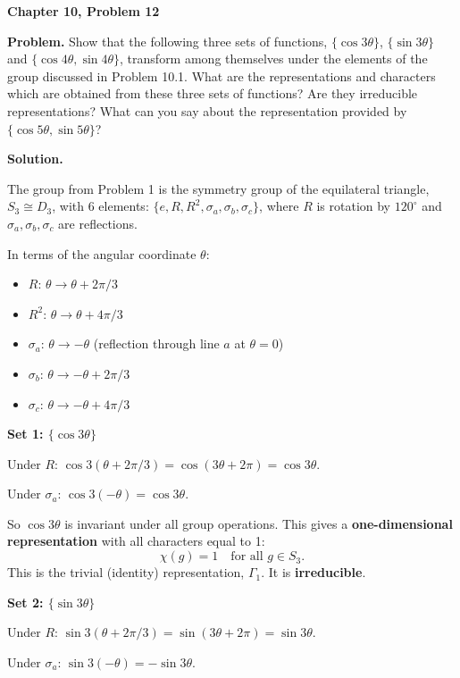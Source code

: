 \documentclass[12pt]{article}
\begin{document}
\begin{center}
{\Large\bfseries Chapter 10, Problem 12}
\end{center}

\noindent\textbf{Problem.} Show that the following three sets of functions, $\{\cos 3\theta\}$, $\{\sin 3\theta\}$ and $\{\cos 4\theta, \sin 4\theta\}$, transform among themselves under the elements of the group discussed in Problem 10.1. What are the representations and characters which are obtained from these three sets of functions? Are they irreducible representations? What can you say about the representation provided by $\{\cos 5\theta, \sin 5\theta\}$?

\bigskip
\noindent\textbf{Solution.}

The group from Problem 1 is the symmetry group of the equilateral triangle, $S_3 \cong D_3$, with 6 elements: $\{e, R, R^2, \sigma_a, \sigma_b, \sigma_c\}$, where $R$ is rotation by $120^\circ$ and $\sigma_a, \sigma_b, \sigma_c$ are reflections.

In terms of the angular coordinate $\theta$:
\begin{itemize}
\item $R$: $\theta \to \theta + 2\pi/3$
\item $R^2$: $\theta \to \theta + 4\pi/3$
\item $\sigma_a$: $\theta \to -\theta$ (reflection through line $a$ at $\theta = 0$)
\item $\sigma_b$: $\theta \to -\theta + 2\pi/3$
\item $\sigma_c$: $\theta \to -\theta + 4\pi/3$
\end{itemize}

\medskip
\noindent\textbf{Set 1: $\{\cos 3\theta\}$}

Under $R$: $\cos 3(\theta + 2\pi/3) = \cos(3\theta + 2\pi) = \cos 3\theta$.

Under $\sigma_a$: $\cos 3(-\theta) = \cos 3\theta$.

So $\cos 3\theta$ is invariant under all group operations. This gives a \textbf{one-dimensional representation} with all characters equal to 1:
\[
\chi(g) = 1 \quad \text{for all } g \in S_3.
\]
This is the trivial (identity) representation, $\Gamma_1$. It is \textbf{irreducible}.

\medskip
\noindent\textbf{Set 2: $\{\sin 3\theta\}$}

Under $R$: $\sin 3(\theta + 2\pi/3) = \sin(3\theta + 2\pi) = \sin 3\theta$.

Under $\sigma_a$: $\sin 3(-\theta) = -\sin 3\theta$.
\end{document}
